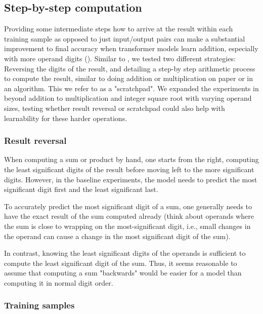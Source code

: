 \subsection{Step-by-step computation}
\label{stepbystep}

Providing some intermediate steps how to arrive at the result within each training sample as opposed to just input/output pairs can make a substantial improvement to final accuracy when transformer models learn addition, especially with more operand digits ().
Similar to \cite{teaching}, we tested two different strategies: Reversing the digits of the result, and detailing a step-by step arithmetic process to compute the result, similar to doing addition or multiplication on paper or in an algorithm. This we refer to as a "scratchpad". We expanded the experiments in \cite{teaching} beyond addition to multiplication and integer square root with varying operand sizes, testing whether result reversal or scratchpad could also help with learnability for these harder operations.

\subsubsection{Result reversal}
\label{resultreversal}

When computing a sum or product by hand, one starts from the right, computing the least significant digits of the result before moving left to the more significant digits. However, in the baseline experiments, the model needs to predict the most significant digit first and the least significant last.

To accurately predict the most significant digit of a sum, one generally needs to have the exact result of the sum computed already (think about operands where the sum is close to wrapping on the most-significant digit, i.e., small changes in the operand can cause a change in the most significant digit of the sum).

In contrast, knowing the least significant digits of the operands is sufficient to compute the least significant digit of the sum. Thus, it seems reasonable to assume that computing a sum "backwards" would be easier for a model than computing it in normal digit order.

\subsubsection{Training samples}

